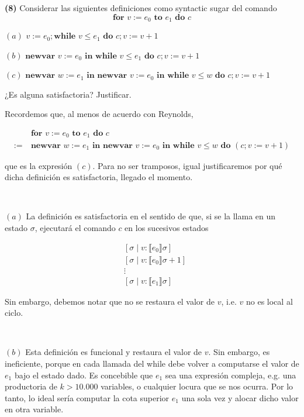 \documentclass[article, 12pt]{article}
\begin{document}
\pagebreak 

\begin{myframe}
  \textbf{(8)} Considerar las siguientes definiciones como syntactic sugar del
  comando $$\textbf{for } v := e_0 \textbf{ to } e_1 \textbf{ do } c$$

  $(a)$ $v := e_0; \textbf{while } v \leq e_1 \textbf{ do } c; v := v + 1$

  $(b)$ $\textbf{newvar } v := e_0 \textbf{ in } \textbf{while } v \leq e_1
  \textbf{ do } c; v := v+1$

  $(c)$ $\textbf{newvar } w := e_1 \textbf{ in newvar } v := e_0 \textbf{ in
  while } v \leq w \textbf{ do } c; v := v+1$

  ¿Es alguna satisfactoria? Justificar.
\end{myframe}

Recordemos que, al menos de acuerdo con Reynolds,

\begin{align*}
  &\textbf{for } v := e_0 \textbf{ to } e_1 \textbf{ do } c \\ 
  := ~ &\textbf{newvar } w := e_1 \textbf{ in newvar } v:= e_0 \textbf{ in while
  } v \leq w \textbf{ do } (c; v := v+1)
\end{align*}

que es la expresión $(c)$. Para no ser tramposos, igual justificaremos por qué
dicha definición es satisfactoria, llegado el momento.

~ 

$(a)$ La definición es satisfactoria en el sentido de que, si se la llama en un
estado $\sigma$, ejecutará el comando
$c$ en los sucesivos estados 

\begin{align*}
  &[\sigma \mid v : \llbracket e_0 \rrbracket\sigma]\\ 
  &[\sigma \mid v : \llbracket e_0 \rrbracket\sigma + 1]\\
  &\vdots\\
  &[\sigma \mid v : \llbracket e_1 \rrbracket\sigma]
\end{align*}

Sin embargo, debemos notar que no se restaura el valor de $v$, i.e. $v$ no es
local al ciclo.

~

$(b)$ Esta definición es funcional y restaura el valor de $v$. Sin embargo, es
ineficiente, porque en cada llamada del while debe volver a computarse el valor
de $e_1$ bajo el estado dado. Es concebible que $e_1$ sea una expresión
compleja, e.g. una productoria de $k > 10.000$ variables, o cualquier locura que
se nos ocurra. Por lo tanto, lo ideal sería computar la cota superior $e_1$ una
sola vez y alocar dicho valor en otra variable.
\end{document}
